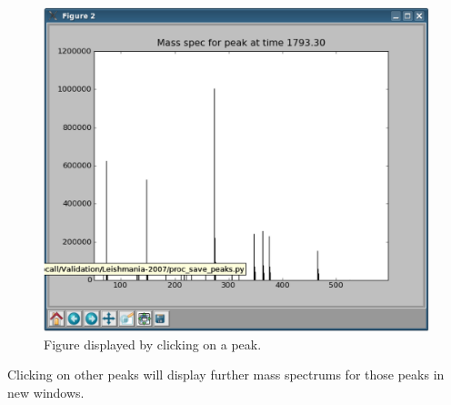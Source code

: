 \begin{figure}
  \begin{center}
    \includegraphics[scale=0.33]{graphics/chapter07/test-71-spec.eps}
  \end{center}
  \caption{Figure displayed by clicking on a peak.}
  \label{71-spec}
\end{figure}



Clicking on other peaks will display further mass spectrums for those peaks in new windows.